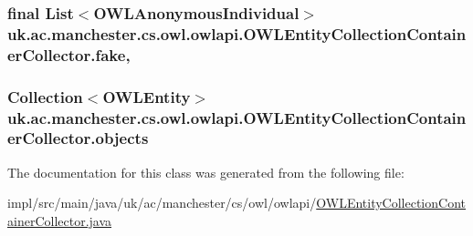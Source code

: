 \hypertarget{classuk_1_1ac_1_1manchester_1_1cs_1_1owl_1_1owlapi_1_1_o_w_l_entity_collection_container_collector_afaef4bc0a8d12e430c4c2c3060335dbf}{
\subsubsection[{fake}]{\setlength{\rightskip}{0pt plus 5cm}final List$<${\bf O\-W\-L\-Anonymous\-Individual}$>$ uk.\-ac.\-manchester.\-cs.\-owl.\-owlapi.\-O\-W\-L\-Entity\-Collection\-Container\-Collector.\-fake\hspace{0.3cm}{\ttfamily [static]}, {\ttfamily [private]}}}\label{classuk_1_1ac_1_1manchester_1_1cs_1_1owl_1_1owlapi_1_1_o_w_l_entity_collection_container_collector_afaef4bc0a8d12e430c4c2c3060335dbf}
\hypertarget{classuk_1_1ac_1_1manchester_1_1cs_1_1owl_1_1owlapi_1_1_o_w_l_entity_collection_container_collector_a86025cdbc20ee5bdcbc49460af810802}{
\subsubsection[{objects}]{\setlength{\rightskip}{0pt plus 5cm}Collection$<${\bf O\-W\-L\-Entity}$>$ uk.\-ac.\-manchester.\-cs.\-owl.\-owlapi.\-O\-W\-L\-Entity\-Collection\-Container\-Collector.\-objects\hspace{0.3cm}{\ttfamily [private]}}}\label{classuk_1_1ac_1_1manchester_1_1cs_1_1owl_1_1owlapi_1_1_o_w_l_entity_collection_container_collector_a86025cdbc20ee5bdcbc49460af810802}


The documentation for this class was generated from the following file\-:\begin{DoxyCompactItemize}
\item 
impl/src/main/java/uk/ac/manchester/cs/owl/owlapi/\hyperlink{_o_w_l_entity_collection_container_collector_8java}{O\-W\-L\-Entity\-Collection\-Container\-Collector.\-java}\end{DoxyCompactItemize}

